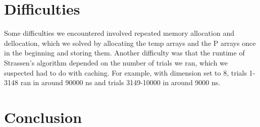 \documentclass[10pt]{article}
\begin{document}
\section {Difficulties}
Some difficulties we encountered involved repeated memory allocation and dellocation, which we solved by allocating the temp arrays and the P arrays once in the beginning and storing them. Another difficulty was that the runtime of Strassen's algorithm depended on the number of trials we ran, which we suspected had to do with caching. For example, with dimension set to 8, trials 1-3148 ran in around 90000 ns and trials 3149-10000 in around 9000 ns. 


\section {Conclusion}
\end{document}
